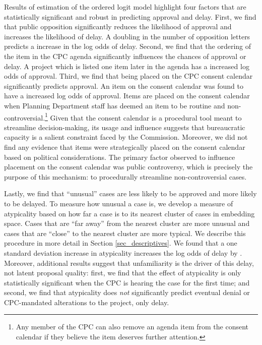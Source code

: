 Results of estimation of the ordered logit model highlight four factors that are statistically significant and robust in predicting approval and delay. First, we find that public opposition significantly reduces the likelihood of approval and increases the likelihood of delay. A doubling in the number of opposition letters predicts a  increase in the log odds of delay. Second, we find that the ordering of the item in the CPC agenda significantly influences the chances of approval or delay. A project which is listed one item later in the agenda has a  increased log odds of approval. 
Third, we find that being placed on the CPC consent calendar significantly predicts approval. An item on the consent calendar was found to have a  increased log odds of approval. Items are placed on the consent calendar when Planning Department staff has deemed an item to be routine and non-controversial.\footnote{Any member of the CPC can also remove an agenda item from the consent calendar if they believe the item deserves further attention.} 
Given that the consent calendar is a procedural tool meant to streamline decision-making, its usage and influence suggests that bureaucratic capacity is a salient constraint faced by the Commission.
Moreover, we did not find any evidence that items were strategically placed on the consent calendar based on political considerations. The primary factor observed to influence placement on the consent calendar was public controversy, which is precisely the purpose of this mechanism: to procedurally streamline non-controversial cases.


Lastly, we find that ``unusual'' cases are less likely to be approved and more likely to be delayed. To measure how unusual a case is, we develop a measure of atypicality based on how far a case is to its nearest cluster of cases in embedding space. Cases that are ``far away'' from the nearest cluster are more unusual and cases that are ``close'' to the nearest cluster are more typical. We describe this procedure in more detail in Section \ref{sec_descriptives}. We found that a one standard deviation increase in atypicality increases the log odds of delay by . Moreover, additional results suggest that unfamiliarity is the driver of this delay, not latent proposal quality: first, we find that the effect of atypicality is only statistically significant when the CPC is hearing the case for the first time; and second, we find that atypicality does \emph{not} significantly predict eventual denial or CPC-mandated alterations to the project, only delay. 

